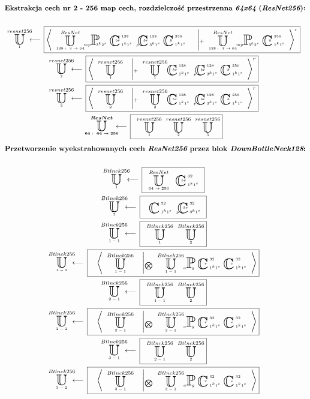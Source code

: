 \begin{equation*}
\begin{gathered}
\textbf{Ekstrakcja cech nr 2 - 256 map cech, rozdzielczość przestrzenna $\textit{64x64}$ ($\textit{ResNet256}$):}
\\~\\
\xunitdef{resnet256}{1}{
\xaggreg{\quad
\xunit{ResNet}{128:\ 3\rightarrow64}{}
\xpool{3^k2^s}{}{mp}{}{}
\xconv{\ 1^k1^s}{\ 128}{}{}{br}
\xconv{\ 3^k1^s}{\ 128}{p}{}{br}
\xconv{\ 1^k1^s}{\ 256}{}{}{b}
\quad \left|_+ \quad
\xunit{ResNet}{128:\ 3\rightarrow64}{}
\xpool{3^k2^s}{}{mp}{}{}
\xconv{\ 1^k1^s}{\ 256}{}{}{b}
\right.}^r}
\\
\xunitdef{resnet256}{2}{
\xaggreg{\quad
\xunit{resnet256}{1}{}
\quad \left|_+ \quad
\xunit{resnet256}{1}{}
\xconv{\ 1^k1^s}{\ 128}{}{}{br}
\xconv{\ 3^k1^s}{\ 128}{p}{}{br}
\xconv{\ 1^k1^s}{\ 256}{}{}{b}
\right.}^r}
\\
\xunitdef{resnet256}{3}{
\xaggreg{\quad
\xunit{resnet256}{2}{}
\quad \left|_+ \quad
\xunit{resnet256}{2}{}
\xconv{\ 1^k1^s}{\ 128}{}{}{br}
\xconv{\ 3^k1^s}{\ 128}{p}{}{br}
\xconv{\ 1^k1^s}{\ 256}{}{}{b}
\right.}^r}
\\
\xunitdef{\boldsymbol{ResNet}}{\boldsymbol{64:\ 64\rightarrow256}}{ \quad
\xunit{resnet256}{1}{} \quad
\xunit{resnet256}{2}{} \quad
\xunit{resnet256}{3}{}}
\end{gathered}
\end{equation*}
\begin{equation*}
\begin{gathered}
\textbf{Przetworzenie wyekstrahowanych cech $\textit{ResNet256}$ przez blok $\textit{DownBottleNeck128}$:}
\\~\\
\xunitdef{Btlnck256}{1}{\quad
\xunit{ResNet}{64\rightarrow256}{} \quad
\xconv{\ 1^k1^s}{\ 32}{}{}{br}}
\\
\xunitdef{Btlnck256}{2}{\quad
\xconv{\ 1^k1^s}{\ 32}{}{}{}
\xconv{\ 3^k1^s}{\ 32}{p}{}{br}}
\\
\xunitdef{Btlnck256}{1-1}{\quad
\xunit{Btlnck256}{1}{} \quad
\xunit{Btlnck256}{2}{}}
\\
\xunitdef{Btlnck256}{1-2}{\quad
\xaggreg{\quad
\xunit{Btlnck256}{1-1}{}
\quad \left|_{\bigotimes} \quad
\xunit{Btlnck256}{1-1}{}
\xpool{g}{}{a}{}{}
\xconv{\ 1^k1^s}{\ 32}{}{}{r}
\xconv{\ 1^k1^s}{\ 32}{}{}{s}
\right.}}
\\
\xunitdef{Btlnck256}{2-1}{\quad
\xunit{Btlnck256}{1-1}{} \quad
\xunit{Btlnck256}{2}{}}
\\
\xunitdef{Btlnck256}{2-2}{\quad
\xaggreg{\quad
\xunit{Btlnck256}{2-1}{}
\quad \left|_{\bigotimes} \quad
\xunit{Btlnck256}{2-1}{}
\xpool{g}{}{a}{}{}
\xconv{\ 1^k1^s}{\ 32}{}{}{r}
\xconv{\ 1^k1^s}{\ 32}{}{}{s}
\right.}}
\\
\xunitdef{Btlnck256}{3-1}{\quad
\xunit{Btlnck256}{2-1}{} \quad
\xunit{Btlnck256}{2}{}}
\\
\xunitdef{Btlnck256}{3-2}{\quad
\xaggreg{\quad
\xunit{Btlnck256}{3-1}{}
\quad \left|_{\bigotimes} \quad
\xunit{Btlnck256}{3-1}{}
\xpool{g}{}{a}{}{}
\xconv{\ 1^k1^s}{\ 32}{}{}{r}
\xconv{\ 1^k1^s}{\ 32}{}{}{s}
\right.}}
\end{gathered}
\end{equation*}
